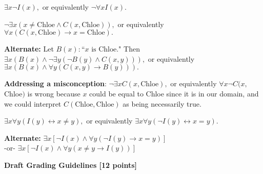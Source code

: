 \documentclass[12pt]{exam}
\begin{document}
\begin{solution}
\begin{qparts}
    \item $\exists x \neg I(x),$ or equivalently $\neg \forall x I(x).$
    
    \item $\neg\exists x (x\ne\text{Chloe} \wedge C(x,\text{Chloe})),$ or equivalently $\forall x (C(x,\text{Chloe})\to x=\text{Chloe}).$
    
    \textbf{Alternate:} Let $B(x)\colon \text{``$x$ is Chloe."}$ Then $\exists x (B(x) \wedge \neg \exists y(\neg B(y) \wedge C(x,y))),$ or equivalently $\exists x (B(x) \wedge  \forall y (C(x,y) \to B(y))).$
    
    \textbf{Addressing a misconception}: $\neg\exists x C(x,\text{Chloe}),$ or equivalently $\forall x \neg C(x,$ Chloe$)$ is wrong because $x$ could be equal to Chloe since it is in our domain, and we could interpret $C(\text{Chloe}, \text{Chloe})$ as being necessarily true.

    \item $\exists x \forall y (I(y) \leftrightarrow x\ne y),$ or equivalently $\exists x\forall y (\neg I(y) \leftrightarrow x=y).$
    
    \textbf{Alternate:} $\exists x [\neg I(x) \wedge \forall y (\neg I(y) \to x=y)]$ \\
    -or-\hspace{1.52cm} $\exists x [\neg I(x) \land \forall y ( x \neq y \to I(y))]$
\end{qparts}
\textbf{Draft Grading Guidelines [12 points]}


\end{solution}
\end{document}
